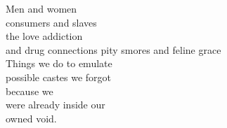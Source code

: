 Men and women\\
consumers and slaves\\
the love addiction\\
and drug connections
pity smores and feline grace\\
Things we do to emulate\\
possible castes we forgot\\
because we\\
were already inside our\\
owned void.\\



